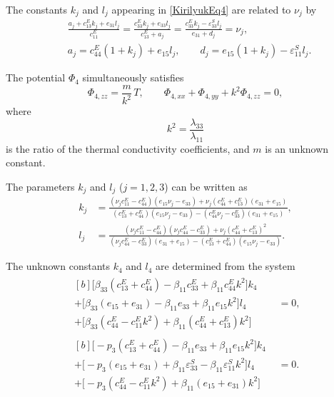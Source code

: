 The constants $k_j$ and $l_j$  appearing in \eqref{KirilyukEq4}
are related to $\nu_j$ by
\begin{align}
	&	\frac{a_j + c_{13}^{E} k_j + e_{31} l_j}{c_{11}^{E}}
	=
	\frac{c_{33}^{E} k_j + e_{33} l_j}{c_{13}^{E}+a_j}
	=
	\frac{c_{33}^{E} k_j - \varepsilon_{33}^{S} l_j}{e_{31}+d_j}
	=
	\nu_j,
	\label{KirilyukEq7}
	\\
	&	a_j = c_{44}^{E}(1+k_j) + e_{15}l_j,
	\qquad
	d_j = e_{15}(1+k_j) - \varepsilon_{11}^{S}l_j.
	\label{KirilyukEq8}
\end{align}

The potential $\Phi_4$ simultaneously satisfies
\begin{equation}
	\Phi_{4,zz} = \frac{m}{k^{2}}\,T,
	\qquad
	\Phi_{4,xx} + \Phi_{4,yy} + k^{2}\Phi_{4,zz} = 0 ,
	\label{KirilyukEq9}
\end{equation}
where
\[
k^{2} = \frac{\lambda_{33}}{\lambda_{11}}
\]
is the ratio of the thermal conductivity coefficients, and $m$ is an unknown constant.

The parameters $k_j$ and $l_j$ ($j=1,2,3$) can be written as
\begin{equation}
	\begin{aligned}
		k_j &=
		\frac{(\nu_j c_{11}^{E}-c_{44}^{E})(e_{15}\nu_j-e_{33})
			+ \nu_j(c_{44}^{E}+c_{13}^{E})(e_{31}+e_{15})}
		{(c_{13}^{E}+c_{44}^{E})(e_{15}\nu_j-e_{33})
			- (c_{44}^{E}\nu_j-c_{33}^{E})(e_{31}+e_{15})},
		\\
		l_j &=
		\frac{(\nu_j c_{11}^{E}-c_{44}^{E})(\nu_j c_{44}^{E}-c_{33}^{E})
			+ \nu_j(c_{44}^{E}+c_{13}^{E})^{2}}
		{(\nu_j c_{44}^{E}-c_{33}^{E})(e_{31}+e_{15})
			- (c_{13}^{E}+c_{44}^{E})(e_{15}\nu_j-e_{33})}.
	\end{aligned}
	\label{KirilyukEq10}
\end{equation}

The unknown constants $k_4$ and $l_4$ are determined from the system
\begin{equation}
	\begin{aligned}
		\begin{multlined}[b]
			\bigl[\beta_{33}(c_{13}^{E}+c_{44}^{E})
			- \beta_{11}c_{33}^{E}
			+ \beta_{11}c_{44}^{E}k^{2}\bigr]k_{4}
			\\
			+ \bigl[\beta_{33}(e_{15}+e_{31})
			- \beta_{11}e_{33}
			+ \beta_{11}e_{15}k^{2}\bigr]l_{4}
			\\
			+ \bigl[\beta_{33}(c_{44}^{E}-c_{11}^{E}k^{2})
			+ \beta_{11}(c_{44}^{E}+c_{13}^{E})k^{2}\bigr] 
		\end{multlined} &= 0,
		\\[6pt]
		\begin{multlined}[b]
			\bigl[-p_{3}(c_{13}^{E}+c_{44}^{E})
			- \beta_{11}e_{33}
			+ \beta_{11}e_{15}k^{2}\bigr]k_{4}
			\\
			+ \bigl[-p_{3}(e_{15}+e_{31})
			+ \beta_{11}\varepsilon_{33}^{S}
			- \beta_{11}\varepsilon_{11}^{S}k^{2}\bigr]l_{4}
			\\
			+ \bigl[-p_{3}(c_{44}^{E}-c_{11}^{E}k^{2})
			+ \beta_{11}(e_{15}+e_{31})k^{2}\bigr]
		\end{multlined} &= 0 .
	\end{aligned}
	\label{KirilyukEq11}
\end{equation}

